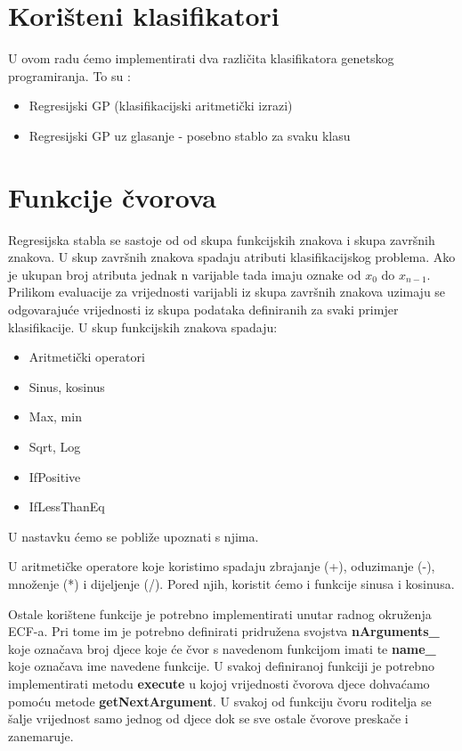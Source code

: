 \documentclass[times, utf8, zavrsni]{fer}
\begin{document}
\section{Korišteni klasifikatori}




U ovom radu ćemo implementirati dva različita klasifikatora genetskog programiranja. To su :

\begin{itemize}
\item Regresijski GP (klasifikacijski aritmetički izrazi)
\item Regresijski GP uz glasanje - posebno stablo za svaku klasu
\end{itemize}


\section{Funkcije čvorova}

Regresijska stabla se sastoje od od skupa funkcijskih znakova i skupa završnih znakova. U skup završnih znakova spadaju atributi klasifikacijskog problema. Ako je ukupan broj atributa jednak n varijable tada imaju oznake od $x_0$ do $x_{n-1}$. Prilikom evaluacije za vrijednosti varijabli iz skupa završnih znakova uzimaju se odgovarajuće vrijednosti iz skupa podataka definiranih za svaki primjer klasifikacije. U skup funkcijskih znakova spadaju:

\begin{itemize}
\item Aritmetički operatori
\item Sinus, kosinus
\item Max, min
\item Sqrt, Log
\item IfPositive
\item IfLessThanEq
\end{itemize}

U nastavku ćemo se pobliže upoznati s njima.

U aritmetičke operatore koje koristimo spadaju zbrajanje (+), oduzimanje (-), množenje (*) i dijeljenje (/). Pored njih, koristit ćemo i funkcije sinusa i kosinusa. 

Ostale korištene funkcije je potrebno implementirati unutar radnog okruženja ECF-a. Pri tome im je potrebno definirati pridružena svojstva \textbf{nArguments\_} koje označava broj djece koje će čvor s navedenom funkcijom imati te \textbf{name\_} koje označava ime navedene funkcije. U svakoj definiranoj funkciji je potrebno implementirati metodu \textbf{execute} u kojoj vrijednosti čvorova djece dohvaćamo pomoću metode \textbf{getNextArgument}. U svakoj od funkciju čvoru roditelja se šalje vrijednost samo jednog od djece dok se sve ostale čvorove preskače i zanemaruje.
\end{document}
